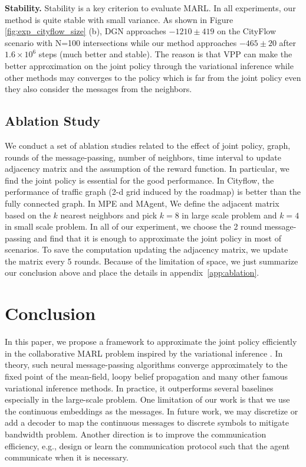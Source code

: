 \documentclass[11pt,a4paper]{article}
\theoremstyle{definition}
\begin{document}


\textbf{Stability.} Stability is a key criterion to evaluate MARL. In all experiments, our method is quite stable with small variance.  As shown in Figure \ref{fig:exp_cityflow_size} (b), DGN approaches $-1210 \pm 419$ on the CityFlow scenario with N=100 intersections while our method approaches $-465 \pm 20$ after $1.6\times 10^6$ steps (much better and stable). The reason is that VPP can make the better approximation on the joint policy through the variational inference while other methods may converges to the policy which is far from the joint policy even they also consider the messages from the neighbors. 

\subsection{Ablation Study}
We conduct a set of ablation studies related to the effect of joint policy, graph, rounds of the message-passing, number of neighbors, time interval to update adjacency matrix and the assumption of the reward function.  In particular, we find the joint policy is essential for the good performance. In Cityflow, the performance of  traffic graph (2-d grid induced by the roadmap) is better than the fully connected graph. In MPE and MAgent, We define the adjacent matrix based on the $k$ nearest neighbors and pick $k=8$ in large scale problem and $k=4$ in small scale problem. In all of our experiment, we choose the 2 round message-passing and find that it is enough to approximate the joint policy in most of scenarios.  To save the computation updating the adjacency matrix, we update the matrix every 5 rounds.   Because of the limitation of space, we just summarize our conclusion above and place the details in appendix~\ref{app:ablation}.


\section{Conclusion}
In this paper, we propose a framework to approximate the joint policy efficiently in the collaborative MARL problem inspired by the variational inference . In theory, such neural message-passing algorithms converge approximately to the fixed point of the mean-field, loopy belief propagation and many other famous variational inference methods. In practice, it outperforms several baselines especially in the large-scale problem. One limitation of our work is that we use the continuous embeddings as the messages. In future work, we may discretize or add a decoder to map the continuous messages to discrete symbols to mitigate bandwidth problem. Another direction is to improve the communication efficiency, e.g., design or learn the communication protocol such that the agent communicate when it is necessary.
\end{document}
